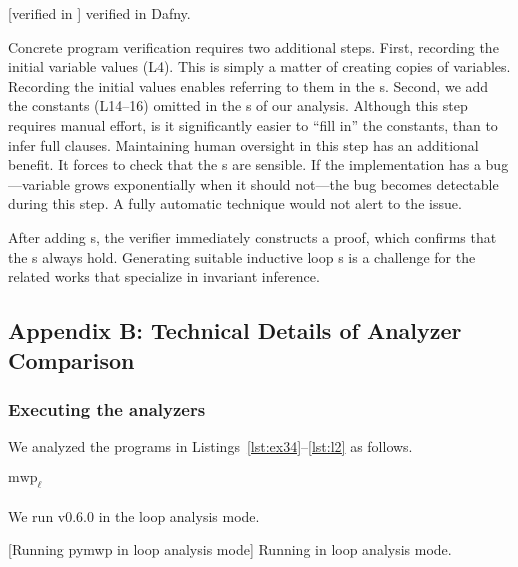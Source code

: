 \begin{center}
\begin{minipage}{\textwidth}
\captionsetup{type=lstlisting}
[\exname verified in ]
{\exname verified in Dafny.}
\label{lst:dafny-ex}
\end{minipage}
\end{center}

Concrete program verification requires two additional steps. First, recording
the initial variable values (L4). This is simply a matter of creating copies of
variables. Recording the initial values enables referring to them in the
s. Second, we add the constants (L14--16) omitted in the
s of our analysis. Although this step requires manual effort,
is it significantly easier to \enquote{fill in} the constants, than to infer
full  clauses. Maintaining human oversight in this step has an
additional benefit. It forces to check that the s are sensible.
If the implementation has a bug---\eg variable grows exponentially when it
should not---the bug becomes detectable during this step. A fully automatic
technique would not alert to the issue.

After adding s, the  verifier immediately constructs a
proof, which confirms that the s always hold. Generating suitable
inductive loop s
is a challenge for the related works that specialize in invariant
inference.

\subsection{Appendix B: Technical Details of Analyzer Comparison}
\label{app:sec:comparison}

\subsubsection{Executing the analyzers}\label{subsec:analyzers}

We analyzed the programs in Listings~\ref{lst:ex34}--\ref{lst:l2} as follows.

\paragraph*{$\text{mwp}_\ell$}
We run  v0.6.0 in the loop analysis mode.
\begin{center}
\begin{minipage}{\textwidth}
\captionsetup{type=lstlisting}
[Running pymwp in loop analysis mode]
{Running  in loop analysis mode.}
\label{lst:mwp-bash}
\end{minipage}
\end{center}

